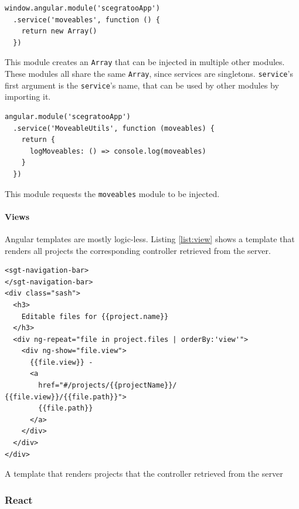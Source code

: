 \begin{listing}
  \begin{verbatim}
window.angular.module('scegratooApp')
  .service('moveables', function () {
    return new Array()
  })
  \end{verbatim}
  \caption{This module creates an \texttt{Array} that can be injected in multiple other modules. These modules all share the same \texttt{Array}, since services are singletons. \texttt{service}'s first argument is the \texttt{service}'s name, that can be used by other modules by importing it.}
  \label{list:angularmodule}
\end{listing}

\begin{listing}
  \begin{verbatim}
angular.module('scegratooApp')
  .service('MoveableUtils', function (moveables) {
    return {
      logMoveables: () => console.log(moveables)
    }
  })
  \end{verbatim}
  \caption{This module requests the \texttt{moveables} module to be injected.}
  \label{list:depinj}
\end{listing}

\paragraph{Views}
\label{par:Views}

Angular templates are mostly logic-less. Listing \ref{list:view}
shows a template that renders all projects the corresponding controller
retrieved from the server.

\begin{listing}
  \begin{verbatim}
<sgt-navigation-bar>
</sgt-navigation-bar>
<div class="sash">
  <h3>
    Editable files for {{project.name}}
  </h3>
  <div ng-repeat="file in project.files | orderBy:'view'">
    <div ng-show="file.view">
      {{file.view}} -
      <a
        href="#/projects/{{projectName}}/ {{file.view}}/{{file.path}}">
        {{file.path}}
      </a>
    </div>
  </div>
</div>
  \end{verbatim}
  \caption{A template that renders projects that the controller retrieved from the server}
  \label{list:view}
\end{listing}

\subsubsection{React}
\label{react}

